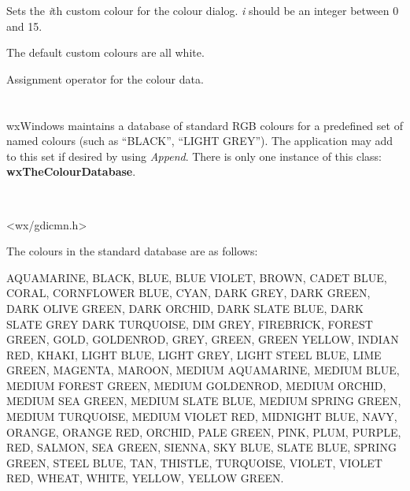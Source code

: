 Sets the {\it i}th custom colour for the colour dialog. {\it i} should
be an integer between 0 and 15.

The default custom colours are all white.

\label{wxcolourdataassign}


Assignment operator for the colour data.

\section{}\label{wxcolourdatabase}

wxWindows maintains a database of standard RGB colours for a predefined
set of named colours (such as ``BLACK'', ``LIGHT GREY''). The
application may add to this set if desired by using {\it Append}.  There
is only one instance of this class: {\bf wxTheColourDatabase}.


\\


<wx/gdicmn.h>


The colours in the standard database are as follows:

AQUAMARINE, BLACK, BLUE, BLUE VIOLET, BROWN, CADET BLUE, CORAL,
CORNFLOWER BLUE, CYAN, DARK GREY, DARK GREEN, DARK OLIVE GREEN, DARK
ORCHID, DARK SLATE BLUE, DARK SLATE GREY DARK TURQUOISE, DIM GREY,
FIREBRICK, FOREST GREEN, GOLD, GOLDENROD, GREY, GREEN, GREEN YELLOW,
INDIAN RED, KHAKI, LIGHT BLUE, LIGHT GREY, LIGHT STEEL BLUE, LIME GREEN,
MAGENTA, MAROON, MEDIUM AQUAMARINE, MEDIUM BLUE, MEDIUM FOREST GREEN,
MEDIUM GOLDENROD, MEDIUM ORCHID, MEDIUM SEA GREEN, MEDIUM SLATE BLUE,
MEDIUM SPRING GREEN, MEDIUM TURQUOISE, MEDIUM VIOLET RED, MIDNIGHT BLUE,
NAVY, ORANGE, ORANGE RED, ORCHID, PALE GREEN, PINK, PLUM, PURPLE, RED,
SALMON, SEA GREEN, SIENNA, SKY BLUE, SLATE BLUE, SPRING GREEN, STEEL
BLUE, TAN, THISTLE, TURQUOISE, VIOLET, VIOLET RED, WHEAT, WHITE, YELLOW,
YELLOW GREEN.




